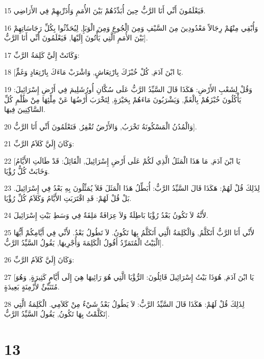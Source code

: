 \par 15 فَيَعْلَمُونَ أَنِّي أَنَا الرَّبُّ حِينَ أُبَدِّدُهُمْ بَيْنَ الأُمَمِ وَأُذَرِّيهِمْ فِي الأَرَاضِي.
\par 16 وَأُبْقِي مِنْهُمْ رِجَالاً مَعْدُودِينَ مِنَ السَّيْفِ وَمِنَ الْجُوعِ وَمِنَ الْوَبَإِ, لِيُحَدِّثُوا بِكُلِّ رَجَاسَاتِهِمْ بَيْنَ الأُمَمِ الَّتِي يَأْتُونَ إِلَيْهَا, فَيَعْلَمُونَ أَنِّي أَنَا الرَّبُّ].
\par 17 وَكَانَتْ إِلَيَّ كَلِمَةُ الرَّبِّ:
\par 18 [يَا ابْنَ آدَمَ, كُلْ خُبْزَكَ بِارْتِعَاشٍ, وَاشْرَبْ مَاءَكَ بِارْتِعَادٍ وَغَمٍّ.
\par 19 وَقُلْ لِشَعْبِ الأَرْضِ: هَكَذَا قَالَ السَّيِّدُ الرَّبُّ عَلَى سُكَّانِ أُورُشَلِيمَ فِي أَرْضِ إِسْرَائِيلَ: يَأْكُلُونَ خُبْزَهُمْ بِالْغَمِّ, وَيَشْرَبُونَ مَاءَهُمْ بِحَيْرَةٍ, لِتَخْرَبَ أَرْضُهَا عَنْ مِلْئِهَا مِنْ ظُلْمِ كُلِّ السَّاكِنِينَ فِيهَا.
\par 20 وَالْمُدُنُ الْمَسْكُونَةُ تَخْرَبُ, وَالأَرْضُ تُقْفِرُ, فَتَعْلَمُونَ أَنِّي أَنَا الرَّبُّ].
\par 21 وَكَانَ إِلَيَّ كَلاَمُ الرَّبِّ:
\par 22 [يَا ابْنَ آدَمَ, مَا هَذَا الْمَثَلُ الَّذِي لَكُمْ عَلَى أَرْضِ إِسْرَائِيلَ, الْقَائِلُ: قَدْ طَالَتِ الأَيَّامُ وَخَابَتْ كُلُّ رُؤْيَا.
\par 23 لِذَلِكَ قُلْ لَهُمْ: هَكَذَا قَالَ السَّيِّدُ الرَّبُّ: أُبَطِّلُ هَذَا الْمَثَلَ فَلاَ يُمَثِّلُونَ بِهِ بَعْدُ فِي إِسْرَائِيلَ. بَلْ قُلْ لَهُمْ: قَدِ اقْتَرَبَتِ الأَيَّامُ وَكَلاَمُ كُلِّ رُؤْيَا.
\par 24 لأَنَّهُ لاَ تَكُونُ بَعْدُ رُؤْيَا بَاطِلَةٌ وَلاَ عِرَافَةٌ مَلِقَةٌ فِي وَسَطِ بَيْتِ إِسْرَائِيلَ.
\par 25 لأَنِّي أَنَا الرَّبُّ أَتَكَلَّمُ, وَالْكَلِمَةُ الَّتِي أَتَكَلَّمُ بِهَا تَكُونُ. لاَ تَطُولُ بَعْدُ. لأَنِّي فِي أَيَّامِكُمْ أَيُّهَا الْبَيْتُ الْمُتَمَرِّدُ أَقُولُ الْكَلِمَةَ وَأُجْرِيهَا, يَقُولُ السَّيِّدُ الرَّبُّ].
\par 26 وَكَانَ إِلَيَّ كَلاَمُ الرَّبِّ:
\par 27 [يَا ابْنَ آدَمَ, هُوَذَا بَيْتُ إِسْرَائِيلَ قَائِلُونَ: الرُّؤْيَا الَّتِي هُوَ رَائِيهَا هِيَ إِلَى أَيَّامٍ كَثِيرَةٍ, وَهُوَ مُتَنَبِّئٌ لأَزْمِنَةٍ بَعِيدَةٍ.
\par 28 لِذَلِكَ قُلْ لَهُمْ: هَكَذَا قَالَ السَّيِّدُ الرَّبُّ: لاَ يَطُولُ بَعْدُ شَيْءٌ مِنْ كَلاَمِي. الْكَلِمَةُ الَّتِي تَكَلَّمْتُ بِهَا تَكُونُ, يَقُولُ السَّيِّدُ الرَّبُّ].

\chapter{13}

